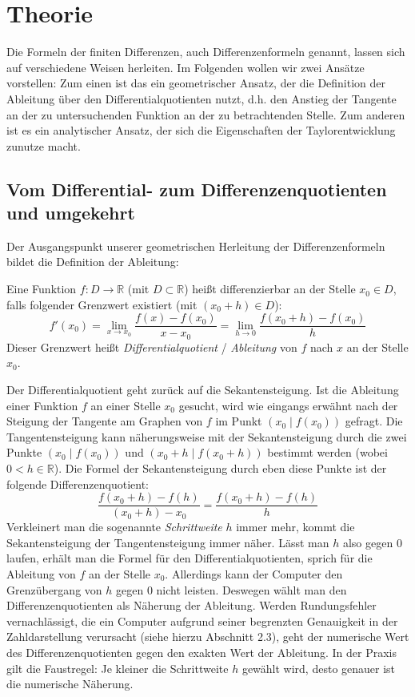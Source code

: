 \documentclass{scrartcl}
\begin{document}
\pagebreak \section{Theorie}
\label{sec:theorie}
Die Formeln der finiten Differenzen, auch Differenzenformeln genannt, lassen sich auf verschiedene Weisen herleiten. Im Folgenden wollen wir zwei Ansätze vorstellen: Zum einen ist das ein geometrischer Ansatz, der die Definition der Ableitung über den Differentialquotienten nutzt, d.h. den Anstieg der Tangente an der zu untersuchenden Funktion an der zu betrachtenden Stelle. Zum anderen ist es ein analytischer Ansatz, der sich die Eigenschaften der Taylorentwicklung zunutze macht.

\subsection{Vom Differential- zum Differenzenquotienten und umgekehrt}
\label{ssec:herleitung1}
Der Ausgangspunkt unserer geometrischen Herleitung der Differenzenformeln bildet die Definition der Ableitung:
\begin{shaded}
Eine Funktion $f:D \rightarrow \mathbb{R}$ (mit $D\subset \mathbb{R}$) heißt differenzierbar an der Stelle $x_0 \in D$, falls folgender Grenzwert existiert (mit $(x_0+h) \in D$): \[f'(x_0) = \lim _{x\to x_0} {\frac {f(x)-f(x_0)}{x-x_0}} = \lim _{h\to 0} {\frac {f(x_0+h)-f(x_0)}{h}}\] Dieser Grenzwert heißt \textit{Differentialquotient} / \textit{Ableitung} von $f$ nach $x$ an der Stelle $x_0$.
\end{shaded}
Der Differentialquotient geht zurück auf die Sekantensteigung. Ist die Ableitung einer Funktion $f$ an einer Stelle $x_0$ gesucht, wird wie eingangs erwähnt nach der Steigung der Tangente am Graphen von $f$ im Punkt $(x_0 \mid f(x_0))$ gefragt. Die Tangentensteigung kann näherungsweise mit der Sekantensteigung durch die zwei Punkte $(x_0 \mid f(x_0))$ und $(x_0 + h \mid f(x_0 + h))$ bestimmt werden (wobei $0<h \in \mathbb{R}$). Die Formel der Sekantensteigung durch eben diese Punkte ist der folgende Differenzenquotient: \[\frac {f(x_0 + h)-f(h)}{(x_0 + h) - x_0} = \frac {f(x_0 + h)-f(h)}{h}\]
Verkleinert man die sogenannte \textit{Schrittweite} $h$ immer mehr, kommt die Sekantensteigung der Tangentensteigung immer näher. Lässt man $h$ also gegen $0$ laufen, erhält man die Formel für den Differentialquotienten, sprich für die Ableitung von $f$ an der Stelle $x_0$. Allerdings kann der Computer den Grenzübergang von $h$ gegen $0$ nicht leisten. Deswegen wählt man den Differenzenquotienten als Näherung der Ableitung. Werden Rundungsfehler vernachlässigt, die ein Computer aufgrund seiner begrenzten Genauigkeit in der Zahldarstellung verursacht (siehe hierzu Abschnitt 2.3), geht der numerische Wert des Differenzenquotienten gegen den exakten Wert der Ableitung. In der Praxis gilt die Faustregel: Je kleiner die Schrittweite $h$ gewählt wird, desto genauer ist die numerische Näherung. \\
\end{document}
